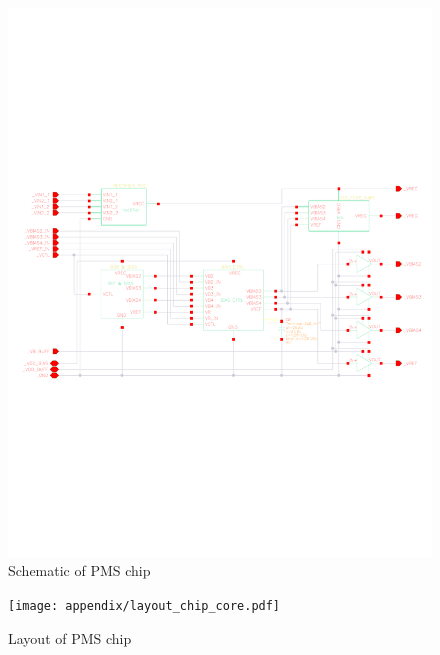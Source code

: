 \documentclass[12pt,a4paper,UKenglish]{report}
\begin{document}
\begin{appendices}
\begin{figure} [!htbp]
 	\centering
  	\includegraphics[width=\textwidth]{appendix/schematic_chip_p.pdf} 
 	\caption{Schematic of PMS chip} 
	\label{fig:appen_schematic_chip} 
\end{figure}

\begin{figure} [!htbp]	%
 	\centering
  	\texttt{[image: appendix/layout\_chip\_core.pdf]} 
 	\caption{Layout of PMS chip} 
	\label{fig:appen_layout_chip} 
\end{figure}


\end{appendices}
\end{document}
